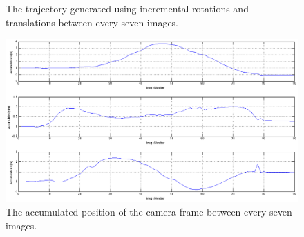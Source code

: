 \documentclass[12pt]{article} %
\begin{document}
\begin{enumerate}[label=\alph*)]
\begin{figure}[h!]
	\centering
	
	
	\caption{The trajectory generated using incremental rotations and translations between every seven images.}
	\label{traj_int7}
\end{figure}

\begin{figure}[h!]
	\centering
	\includegraphics[width=450px]{position_adjusted_int7.png}
	\caption{The accumulated position of the camera frame between every seven images.}
	\label{pos_int7}
\end{figure}


\end{enumerate}
\end{document}
